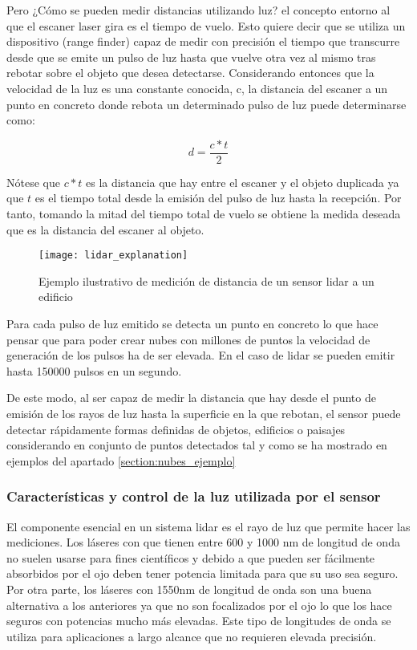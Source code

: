 Pero ¿Cómo se pueden medir distancias utilizando luz? el concepto entorno al que el escaner laser gira es el tiempo de vuelo. Esto quiere decir que se utiliza un dispositivo (range finder) capaz de medir con precisión el tiempo que transcurre desde que se emite un pulso de luz hasta que vuelve otra vez al mismo tras rebotar sobre el objeto que desea detectarse. Considerando entonces que la velocidad de la luz es una constante conocida, c, la distancia del escaner a un punto en concreto donde rebota un determinado pulso de luz puede determinarse como:

\begin{equation}
d = \frac{c*t}{2}
\end{equation}


Nótese que $c*t$ es la distancia que hay entre el escaner y el objeto duplicada ya que $t$ es el tiempo total desde la emisión del pulso de luz hasta la recepción. Por tanto, tomando la mitad del tiempo total de vuelo se obtiene la medida deseada que es la distancia del escaner al objeto.

\begin{figure}
\centering
{}
  \texttt{[image: lidar\_explanation]}
  \caption{Ejemplo ilustrativo de medición de distancia de un sensor lidar a un edificio}\label{fig:lidar explanation}
\endminipage\hfill

\end{figure}

Para cada pulso de luz emitido se detecta un punto en concreto lo que hace pensar que para poder crear nubes con millones de puntos la velocidad de generación de los pulsos ha de ser elevada. En el caso de lidar se pueden emitir hasta 150000 pulsos en un segundo.

De este modo, al ser capaz de medir la distancia que hay desde el punto de emisión de los rayos de luz hasta la superficie en la que rebotan, el sensor puede detectar rápidamente formas definidas de objetos, edificios o paisajes considerando en conjunto de puntos detectados tal y como se ha mostrado en ejemplos del apartado \ref{section:nubes_ejemplo}

\subsubsection{Características y control de la luz utilizada por el sensor}
El componente esencial en un sistema lidar es el rayo de luz que permite hacer las mediciones. Los láseres con que tienen entre 600 y 1000 nm de longitud de onda no suelen usarse para fines científicos y debido a que pueden ser fácilmente absorbidos por el ojo deben tener potencia limitada para que su uso sea seguro.
Por otra parte, los láseres con 1550nm de longitud de onda son una buena alternativa a los anteriores ya que no son focalizados por el ojo lo que los hace seguros con potencias mucho más elevadas. Este tipo de longitudes de onda se utiliza para aplicaciones a largo alcance que no requieren elevada precisión. 

